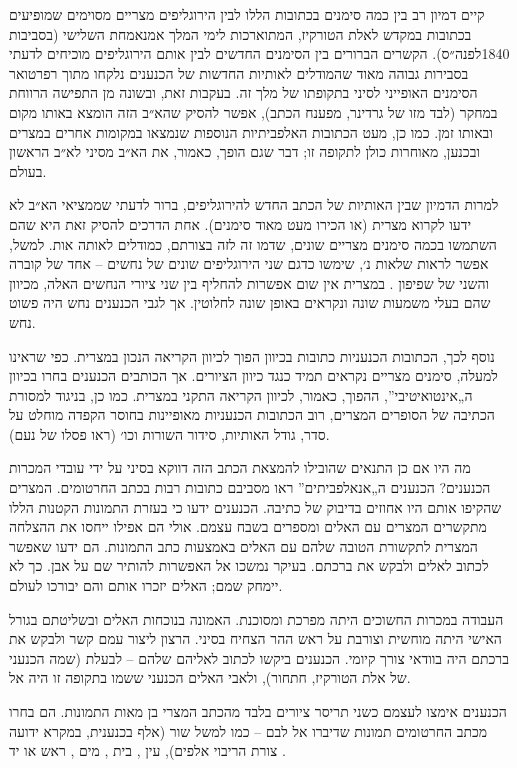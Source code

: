 קיים דמיון רב בין כמה סימנים בכתובות הללו לבין הירוגליפים מצריים מסוימים שמופיעים בכתובות במקדש לאלת הטורקיז, המתוארכות לימי המלך אמנאמחת השלישי (בסביבות 1840לפנה״ס). הקשרים הברורים בין הסימנים החדשים לבין אותם הירוגליפים מוכיחים לדעתי בסבירות גבוהה מאוד שהמודלים לאותיות החדשות של הכנענים נלקחו מתוך רפרטואר הסימנים האופייני לסיני בתקופתו של מלך זה. בעקבות זאת, ובשונה מן התפישה הרווחת במחקר (לבד מזו של גרדינר, מפענח הכתב), אפשר להסיק שהא״ב הזה הומצא באותו מקום ובאותו זמן. כמו כן, מעט הכתובות האלפביתיות הנוספות שנמצאו במקומות אחרים במצרים ובכנען, מאוחרות כולן לתקופה זו; דבר שגם הופך, כאמור, את הא״ב מסיני לא״ב הראשון בעולם.

למרות הדמיון שבין האותיות של הכתב החדש להירוגליפים, ברור לדעתי שממציאי הא״ב לא ידעו לקרוא מצרית (או הכירו מעט מאוד סימנים). אחת הדרכים להסיק זאת היא שהם השתמשו בכמה סימנים מצריים שונים, שדמו זה לזה בצורתם, כמודלים לאותה אות. למשל, אפשר לראות שלאות נ׳, שימשו כדגם שני הירוגליפים שונים של נחשים – אחד של קוברה והשני של שפיפון . במצרית אין שום אפשרות להחליף בין שני ציורי הנחשים האלה, מכיוון שהם בעלי משמעות שונה ונקראים באופן שונה לחלוטין. אך לגבי הכנענים נחש היה פשוט נחש.

נוסף לכך, הכתובות הכנעניות כתובות בכיוון הפוך לכיוון הקריאה הנכון במצרית. כפי שראינו למעלה, סימנים מצריים נקראים תמיד כנגד כיוון הציורים. אך הכותבים הכנענים בחרו בכיוון ה„אינטואיטיבי”, ההפוך, כאמור, לכיוון הקריאה התקני במצרית. כמו כן, בניגוד למסורת הכתיבה של הסופרים המצרים, רוב הכתובות הכנעניות מאופיינות בחוסר הקפדה מוחלט על סדר, גודל האותיות, סידור השורות וכו׳ (ראו פסלו של נעם).



מה היו אם כן התנאים שהובילו להמצאת הכתב הזה דווקא בסיני על ידי עובדי המכרות הכנענים? הכנענים ה„אנאלפביתים” ראו מסביבם כתובות רבות בכתב החרטומים. המצרים שהקיפו אותם היו אחוזים בדיבוק של כתיבה. הכנענים ידעו כי בעזרת התמונות הקטנות הללו מתקשרים המצרים עם האלים ומספרים בשבח עצמם. אולי הם אפילו ייחסו את ההצלחה המצרית לתקשורת הטובה שלהם עם האלים באמצעות כתב התמונות. הם ידעו שאפשר לכתוב לאלים ולבקש את ברכתם. בעיקר נמשכו אל האפשרות להותיר שם על אבן. כך לא יימחק שמם; האלים יזכרו אותם והם יבורכו לעולם.

העבודה במכרות החשוכים היתה מפרכת ומסוכנת. האמונה בנוכחות האלים ובשליטתם בגורל האישי היתה מוחשית וצורבת על ראש ההר הצחיח בסיני. הרצון ליצור עמם קשר ולבקש את ברכתם היה בוודאי צורך קיומי. הכנענים ביקשו לכתוב לאליהם שלהם – לבעלת (שמה הכנעני של אלת הטורקיז, חתחור), ולאבי האלים הכנעני ששמו בתקופה זו היה אל.

הכנענים אימצו לעצמם כשני תריסר ציורים בלבד מהכתב המצרי בן מאות התמונות. הם בחרו מכתב החרטומים תמונות שדיברו אל לבם – כמו למשל שור (אלף בכנענית, במקרא ידועה צורת הריבוי אלפים), עין , בית , מים , ראש או יד .

